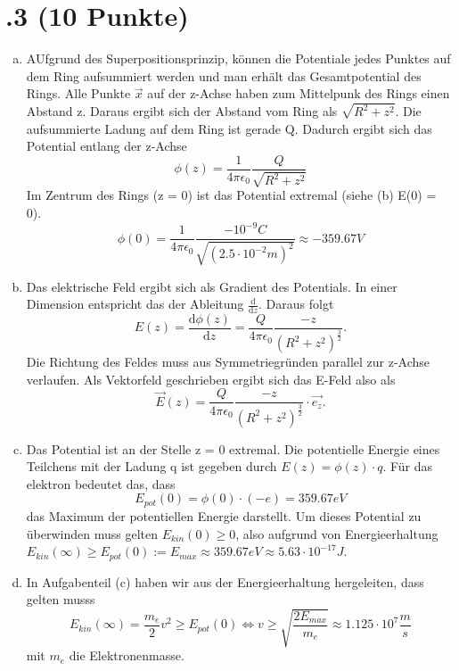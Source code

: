 \section*{\nr.3 \titthree (10 Punkte)}
\begin{enumerate}[(a)]
\item AUfgrund des Superpositionsprinzip, können die Potentiale jedes Punktes auf dem Ring aufsummiert werden und man erhält das Gesamtpotential des Rings. Alle Punkte $\vec{x} $ auf der z-Achse haben zum Mittelpunk des Rings einen Abstand z. Daraus ergibt sich der Abstand vom Ring als $\sqrt{R^2 + z^2}$. Die aufsummierte Ladung auf dem Ring ist gerade Q. Dadurch ergibt sich das Potential entlang der z-Achse
\begin{equation}
\phi(z) = \frac{1}{4\pi \epsilon_{0}} \frac{Q}{\sqrt{R^2 + z^2}}
\end{equation}
Im Zentrum des Rings (z = 0) ist das Potential extremal (siehe (b) E(0) = 0).
\begin{equation}
\phi(0) = \frac{1}{4\pi \epsilon_{0}} \frac{-10^{-9}C}{\sqrt{(2.5\cdot 10^{-2}m)^2}} \approx -359.67 V
\end{equation}
\item Das elektrische Feld ergibt sich als Gradient des Potentials. In einer Dimension entspricht das der Ableitung $\frac{\mathrm{d}}{\mathrm{d}z}$. Daraus folgt
\begin{equation}
E(z) = \frac{\mathrm{d}\phi (z)}{\mathrm{d}z}  = \frac{Q}{4\pi \epsilon_{0}} \frac{-z}{(R^2 + z^2)^{\frac{3}{2}}}.
\end{equation}
Die Richtung des Feldes muss aus Symmetriegründen parallel zur z-Achse verlaufen. Als Vektorfeld geschrieben ergibt sich das E-Feld also als
\begin{equation}
\vec{E}(z) = \frac{Q}{4\pi \epsilon_{0}} \frac{-z}{(R^2 + z^2)^{\frac{3}{2}}} \cdot \vec{e_{z}}.
\end{equation}
\item Das Potential ist an der Stelle z = 0 extremal. Die potentielle Energie eines Teilchens mit der Ladung q ist gegeben durch $E(z) = \phi(z) \cdot q$. Für das elektron bedeutet das, dass
\begin{equation}
E_{pot}(0) = \phi(0) \cdot (-e) = 359.67 eV
\end{equation}
das Maximum der potentiellen Energie darstellt. Um dieses Potential zu überwinden muss gelten $E_{kin}(0) \ge 0$, also aufgrund von Energieerhaltung $E_{kin}(\infty) \ge E_{pot}(0) := E_{max} \approx 359.67 eV \approx 5.63 \cdot 10^{-17} J$.
\item In Aufgabenteil (c) haben wir aus der Energieerhaltung hergeleiten, dass gelten musss
\begin{equation}
E_{kin}(\infty) = \frac{m_{e}}{2} v^2 \ge E_{pot}(0) \Leftrightarrow v \ge \sqrt{\frac{2E_{max}}{m_{e}}} \approx 1.125 \cdot 10^{7} \frac{m}{s}
\end{equation}
mit $m_{e}$ die Elektronenmasse.
\end{enumerate}